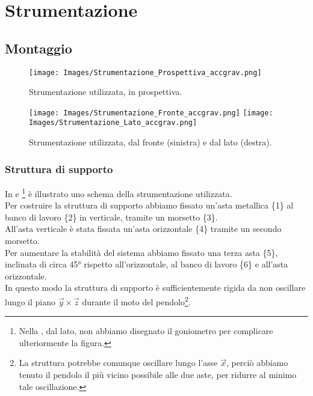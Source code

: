 \section{Strumentazione}\label{strumentazione}
\subsection*{Montaggio}\label{montaggio}
\begin{figure}[h]
    \centering
    \texttt{[image: Images/Strumentazione\_Prospettiva\_accgrav.png]}
    \caption{Strumentazione utilizzata, in prospettiva.}
    \label{fig:strumentazione}
\end{figure}
\begin{figure}[h]
    \centering
    \texttt{[image: Images/Strumentazione\_Fronte\_accgrav.png]}
    \vline
    \vspace{2pt}
    \texttt{[image: Images/Strumentazione\_Lato\_accgrav.png]}
    \caption{Strumentazione utilizzata, dal fronte (sinistra) e dal lato (destra).}
    \label{fig:strumentazione 2}
\end{figure}

\subsubsection*{Struttura di supporto}
In  e \footnote{Nella , dal lato, non abbiamo disegnato il goniometro per complicare ulteriormente la figura.} è illustrato uno schema della strumentazione utilizzata.\\

Per costruire la struttura di supporto abbiamo fissato un'asta metallica \{1\} al banco di lavoro \{2\} in verticale, tramite un morsetto \{3\}. \\
All'asta verticale è stata fissata un'asta orizzontale \{4\} tramite un secondo morsetto. \\
Per aumentare la stabilità del sistema abbiamo fissato una terza asta \{5\}, inclinata di circa 45° rispetto all'orizzontale, al banco di lavoro \{6\} e all'asta orizzontale.\\
In questo modo la struttura di supporto è sufficientemente rigida da non oscillare lungo il piano $\Vec{y}\times\Vec{z}$ durante il moto del pendolo\footnote{La struttura potrebbe comunque oscillare lungo l'asse $\Vec{x}$, perciò abbiamo tenuto il pendolo il più vicino possibile alle due aste, per ridurre al minimo tale oscillazione.}.

